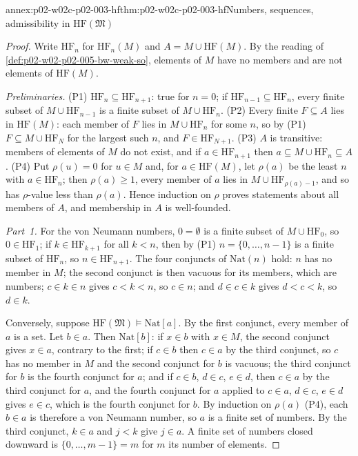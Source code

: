 \begin{annexitem}{annex:p02-w02c-p02-003-hf}{thm:p02-w02c-p02-003-hf}{Numbers, sequences, admissibility in \(\mathrm{HF}(\mathfrak M)\)}
\begin{proof}
Write \(\mathrm{HF}_n\) for \(\mathrm{HF}_n(M)\) and \(A=M\cup\mathrm{HF}(M)\).
By the reading of \cref{def:p02-w02-p02-005-bw-weak-so}, elements of \(M\)
have no members and are not elements of \(\mathrm{HF}(M)\).

\emph{Preliminaries.}  (P1) \(\mathrm{HF}_n\subseteq\mathrm{HF}_{n+1}\):
true for \(n=0\); if \(\mathrm{HF}_{n-1}\subseteq\mathrm{HF}_n\), every
finite subset of \(M\cup\mathrm{HF}_{n-1}\) is a finite subset of
\(M\cup\mathrm{HF}_n\).  (P2) Every finite \(F\subseteq A\) lies in
\(\mathrm{HF}(M)\): each member of \(F\) lies in \(M\cup\mathrm{HF}_{n}\)
for some \(n\), so by (P1) \(F\subseteq M\cup\mathrm{HF}_N\) for the
largest such \(n\), and \(F\in\mathrm{HF}_{N+1}\).  (P3) \(A\) is
transitive: members of elements of \(M\) do not exist, and if
\(a\in\mathrm{HF}_{n+1}\) then \(a\subseteq M\cup\mathrm{HF}_n\subseteq A\).
(P4) Put \(\rho(u)=0\) for \(u\in M\) and, for \(a\in\mathrm{HF}(M)\), let
\(\rho(a)\) be the least \(n\) with \(a\in\mathrm{HF}_n\); then
\(\rho(a)\geq1\), every member of \(a\) lies in
\(M\cup\mathrm{HF}_{\rho(a)-1}\), and so has \(\rho\)-value less than
\(\rho(a)\).  Hence induction on \(\rho\) proves statements about all
members of \(A\), and membership in \(A\) is well-founded.

\emph{Part~1.}  For the von Neumann numbers, \(0=\emptyset\) is a finite
subset of \(M\cup\mathrm{HF}_0\), so \(0\in\mathrm{HF}_1\); if
\(k\in\mathrm{HF}_{k+1}\) for all \(k<n\), then by (P1)
\(n=\{0,\ldots,n-1\}\) is a finite subset of \(\mathrm{HF}_n\), so
\(n\in\mathrm{HF}_{n+1}\).  The four conjuncts of \(\mathrm{Nat}(n)\) hold:
\(n\) has no member in \(M\); the second conjunct is then vacuous for its
members, which are numbers; \(c\in k\in n\) gives \(c<k<n\), so \(c\in n\);
and \(d\in c\in k\) gives \(d<c<k\), so \(d\in k\).

Conversely, suppose \(\mathrm{HF}(\mathfrak M)\models\mathrm{Nat}[a]\).  By
the first conjunct, every member of \(a\) is a set.  Let \(b\in a\).  Then
\(\mathrm{Nat}[b]\): if \(x\in b\) with \(x\in M\), the second conjunct
gives \(x\in a\), contrary to the first; if \(c\in b\) then \(c\in a\) by
the third conjunct, so \(c\) has no member in \(M\) and the second conjunct
for \(b\) is vacuous; the third conjunct for \(b\) is the fourth conjunct
for \(a\); and if \(c\in b\), \(d\in c\), \(e\in d\), then \(c\in a\) by the
third conjunct for \(a\), and the fourth conjunct for \(a\) applied to
\(c\in a\), \(d\in c\), \(e\in d\) gives \(e\in c\), which is the fourth
conjunct for \(b\).  By induction on \(\rho(a)\) (P4), each \(b\in a\) is
therefore a von Neumann number, so \(a\) is a finite set of numbers.  By
the third conjunct, \(k\in a\) and \(j<k\) give \(j\in a\).  A finite set
of numbers closed downward is \(\{0,\ldots,m-1\}=m\) for \(m\) its number
of elements.


\end{proof}
\end{annexitem}
